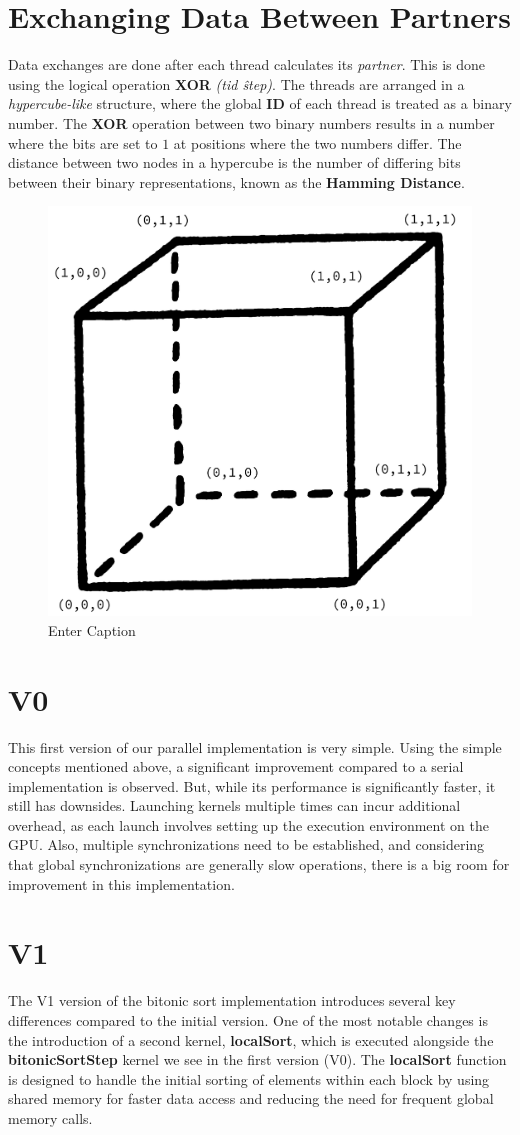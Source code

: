 \documentclass[12pt]{report}
\begin{document}
\section{Exchanging Data Between Partners}
Data exchanges are done after each thread calculates its \textit{partner}. This is done using the logical operation \textbf{XOR} \textit{(tid \^ step)}. The threads are arranged in a \textit{hypercube-like} structure, where the global \textbf{ID} of each thread is treated as a binary number. The \textbf{XOR} operation between two binary numbers results in a number where the bits are set to $1$ at positions where the two numbers differ. The distance between two nodes in a hypercube is the number of differing bits between their binary representations, known as the \textbf{Hamming Distance}.
\begin{figure}[!h]
    \centering
    \includegraphics[width=0.5\linewidth]{cube.png}
    \caption{Enter Caption}
    \label{fig:enter-label}
\end{figure}

\newpage
\section{V0}
This first version of our parallel implementation is very simple. Using the simple concepts mentioned above, a significant improvement compared to a serial implementation is observed. But, while its performance is significantly faster, it still has downsides. Launching kernels multiple times can incur additional overhead, as each launch involves setting up the execution environment on the GPU. Also, multiple synchronizations need to be established, and considering that global synchronizations are generally slow operations, there is a big room for improvement in this implementation.

\section{V1}
The V1 version of the bitonic sort implementation introduces several key differences compared to the initial version. One of the most notable changes is the introduction of a second kernel, \textbf{localSort}, which is executed alongside the \textbf{bitonicSortStep} kernel we see in the first version (V0). The \textbf{localSort} function is designed to handle the initial sorting of elements within each block by using shared memory for faster data access and reducing the need for frequent global memory calls.
\end{document}

